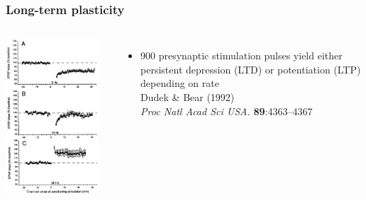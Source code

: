 \documentclass{beamer}
\begin{document}
\begin{frame}
  \frametitle{Long-term plasticity}

\begin{columns}
\includegraphics[width=0.9\textwidth]{./figures/ltp_ltd_exp}
\begin{itemize}
\item 900 presynaptic stimulation pulses yield either persistent depression (LTD) or potentiation (LTP) depending on rate\\
\vspace*{3mm}
\tiny{Dudek \& Bear (1992)\\
\textit{Proc Natl Acad Sci USA.} \textbf{89}:4363--4367}
\end{itemize}


\end{columns}
\end{frame}
\end{document}
